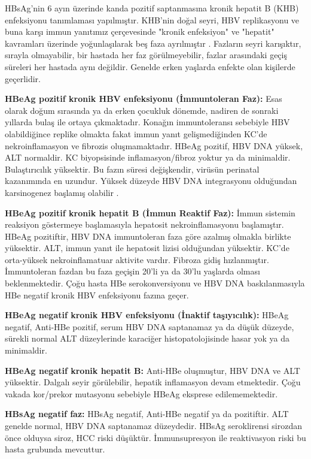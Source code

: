 HBsAg'nin 6 ayın üzerinde kanda pozitif saptanmasına kronik hepatit B (KHB) enfeksiyonu tanımlaması yapılmıştır. KHB'nin doğal seyri, HBV replikasyonu ve buna karşı immun yanıtımız çerçevesinde "kronik enfeksiyon" ve "hepatit" kavramları üzerinde yoğunlaşılarak beş faza ayrılmıştır \cite{european2017easl}. Fazların seyri karışıktır, sırayla olmayabilir, bir hastada her faz görülmeyebilir, fazlar arasındaki geçiş süreleri her hastada aynı değildir. Genelde erken yaşlarda enfekte olan kişilerde geçerlidir. 

\textbf{HBeAg pozitif kronik HBV enfeksiyonu (İmmuntoleran Faz):} Esas olarak doğum sırasında ya da erken çocukluk dönemde, nadiren de sonraki yıllarda bulaş ile ortaya çıkmaktadır. Konağın immuntoleransı sebebiyle HBV olabildiğince replike olmakta fakat immun yanıt gelişmediğinden KC'de nekroinflamasyon ve fibrozis oluşmamaktadır. HBeAg pozitif, HBV DNA yüksek, ALT normaldir. KC biyopsisinde inflamasyon/fibroz yoktur ya da minimaldir. Bulaştırıcılık yüksektir. Bu fazın süresi değişkendir, virüsün perinatal kazanımında en uzundur. Yüksek düzeyde HBV DNA integrasyonu olduğundan karsinogenez başlamış olabilir \cite{mason2016hbv}.

\textbf{HBeAg pozitif kronik hepatit B (İmmun Reaktif Faz):} İmmun sistemin reaksiyon göstermeye başlamasıyla hepatosit nekroinflamasyonu başlamıştır. HBeAg pozitiftir, HBV DNA immuntoleran faza göre azalmış olmakla birlikte yüksektir. ALT, immun yanıt ile hepatosit lizisi olduğundan yüksektir. KC'de orta-yüksek nekroinflamatuar aktivite vardır. Fibroza gidiş hızlanmıştır. İmmuntoleran fazdan bu faza geçişin 20'li ya da 30'lu yaşlarda olması beklenmektedir.  Çoğu hasta HBe serokonversiyonu ve HBV DNA baskılanmasıyla HBe negatif kronik HBV enfeksiyonu fazına geçer.

\textbf{HBeAg negatif kronik HBV enfeksiyonu (İnaktif taşıyıcılık):} HBeAg negatif, Anti-HBe pozitif, serum HBV DNA saptanamaz ya da düşük düzeyde, sürekli normal ALT düzeylerinde karaciğer histopatolojisinde hasar yok ya da minimaldir.

\textbf{HBeAg negatif kronik hepatit B: } Anti-HBe oluşmuştur, HBV DNA ve ALT yüksektir. Dalgalı seyir görülebilir, hepatik inflamasyon devam etmektedir. Çoğu vakada kor/prekor mutasyonu sebebiyle HBeAg eksprese edilememektedir.

\textbf{HBsAg negatif faz:} HBsAg negatif, Anti-HBe negatif ya da pozitiftir. ALT genelde normal, HBV DNA saptanamaz düzeydedir. HBsAg seroklirensi sirozdan önce olduysa siroz, HCC riski düşüktür. İmmunsupresyon ile reaktivasyon riski bu hasta grubunda mevcuttur.  


